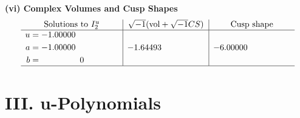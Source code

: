\documentclass[1p]{elsarticle_modified}
\theoremstyle{definition}
\newcommand{\I}{\sqrt{-1}}
\begin{document}
\newpage\flushleft \textbf{(vi) Complex Volumes and Cusp Shapes}
$$\begin{array}{c|c|c}  
\text{Solutions to }I^u_{2}& \I (\text{vol} + \sqrt{-1}CS) & \text{Cusp shape}\\
 \hline 
\begin{aligned}
u &= -1.00000\phantom{ +0.000000I} \\
a &= -1.00000\phantom{ +0.000000I} \\
b &= \phantom{-0.000000 } 0\end{aligned}
 & -1.64493\phantom{ +0.000000I} & -6.00000\phantom{ +0.000000I}\\
 \hline 
 \end{array}$$\newpage
\newpage\renewcommand{\arraystretch}{1}
\centering \section*{ III. u-Polynomials}
\end{document}

